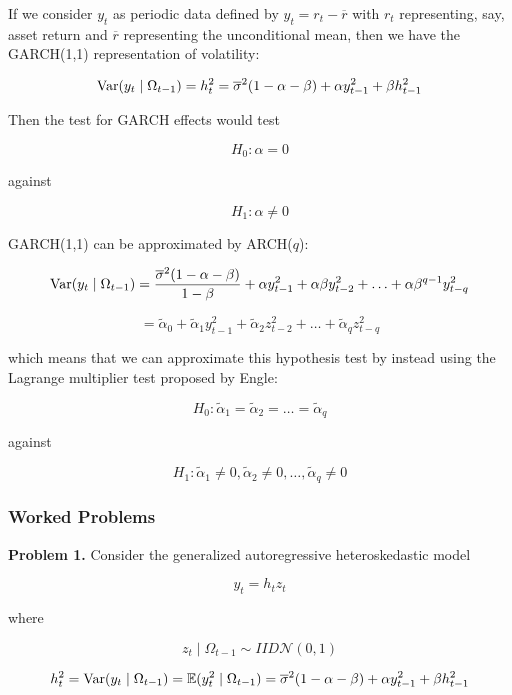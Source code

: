 If we consider \(y_t\) as periodic data defined by \(y_t = r_t - \overline{r}\) with \(r_t\) representing, say, asset return and \(\overline{r}\) representing the unconditional mean, then we have the GARCH(1,1) representation of volatility:

\[
\mathrm{Var}(y_t \mid \Omega_{t-1}) = h_t^2 =  \overline{\sigma}^2(1 - \alpha - \beta) + \alpha y_{t-1}^2 + \beta h_{t-1}^2
\]

Then the test for GARCH effects would test

\[
H_0:  \alpha = 0
\]

against 

\[
H_1: \alpha \neq 0 
\]

GARCH(1,1) can be approximated by ARCH(\(q\)):

\[
\mathrm{Var}(y_t \mid \Omega_{t-1}) = \frac{\overline{\sigma}^2(1 - \alpha - \beta)}{1 - \beta} + \alpha y_{t-1}^2 + \alpha \beta y_{t-2}^2 + \ldots + \alpha \beta^{q-1} y_{t-q}^2
\]

\[
= \tilde{\alpha}_0 + \tilde{\alpha}_1 y_{t-1}^2 + \tilde{\alpha}_2 z_{t-2}^2 + \ldots + \tilde{\alpha}_q z_{t-q}^2
\]

which means that we can approximate this hypothesis test by instead using the Lagrange multiplier test proposed by Engle:

\[
H_0: \tilde{\alpha}_1 = \tilde{\alpha}_2 = \ldots = \tilde{\alpha}_q
\]

against

\[
H_1: \tilde{\alpha}_1 \neq 0, \tilde{\alpha}_2 \neq 0, \ldots, \tilde{\alpha}_q \neq 0
\]


\subsubsection{Worked Problems}


\textbf{Problem 1.} Consider the generalized autoregressive heteroskedastic model 

\[
y_t = h_t z_t
\]

where

\begin{equation}\label{ts.hw6.eq1.1}
z_t \mid \Omega_{t-1} \sim IID\mathcal{N}(0,1)
\end{equation}

\begin{equation}\label{ts.hw6.eq1.2}
h_t^2 = \mathrm{Var}(y_t \mid \Omega_{t-1}) = \mathbb{E}(y_t^2 \mid \Omega_{t-1}) = \overline{\sigma}^2(1 - \alpha - \beta) + \alpha y_{t-1}^2 + \beta h_{t-1}^2 
\end{equation}

